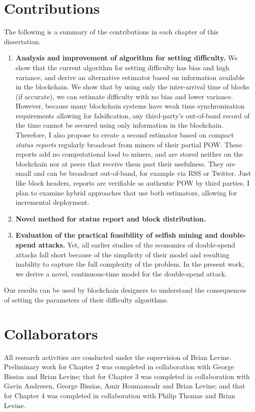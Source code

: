 \section*{Contributions}
The following is a summary of the contributions in each chapter of this dissertation. 
\begin{enumerate}
\item \textbf{Analysis and improvement of algorithm for setting difficulty.} We show that the current algorithm for setting difficulty has bias and high variance, and derive an alternative estimator based on information available in the blockchain. We show that by using only the inter-arrival time of blocks (if accurate), we can estimate difficulty with no bias and lower variance. However, because many blockchain systems have weak time synchronization requirements allowing for falsification, any third-party's out-of-band record of the time cannot be secured using only information in the blockchain. Therefore, I also propose to create a second estimator based on compact {\em status reports} regularly broadcast from miners of their partial POW. These reports add no computational load to miners, and are stored neither on the blockchain nor at peers that receive them past their usefulness. They are small and can be broadcast out-of-band, for example via RSS or Twitter. Just like block headers, reports are verifiable as authentic POW by third parties. I plan to examine hybrid approaches that use both estimators, allowing for incremental deployment. 
\item \textbf{Novel method for status report and block distribution.}
\item \textbf{Evaluation of the practical feasibility of selfish mining and double-spend attacks.} Yet, all earlier studies of the economics of double-spend attacks fall short because of the simplicity of their model and resulting inability to capture the full complexity of the problem. In the present work, we derive a novel, continuous-time model for the double-spend attack.
\end{enumerate}
Our results can be used by blockchain designers to understand the consequences of setting the parameters of their difficulty algorithms. 

\section*{Collaborators}
All research activities are conducted under the supervision of Brian Levine. Preliminary work for Chapter 2 was completed in collaboration with George Bissias and Brian Levine; that for Chapter 3 was completed in collaboration with Gavin Andresen, George Bissias, Amir Houmansadr and Brian Levine; and that for Chapter 4 was completed in collaboration with Philip Thomas and Brian Levine.